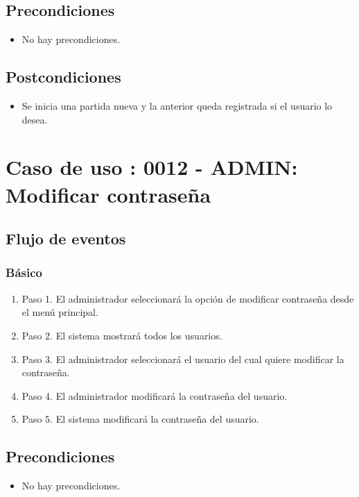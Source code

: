 \subsection{Precondiciones}
\begin{itemize}
\item No hay precondiciones.
\end{itemize}

\subsection{Postcondiciones}
\begin{itemize}
\item Se inicia una partida nueva y la anterior queda registrada si el usuario lo desea. 
\end{itemize}



\section{Caso de uso : 0012 - ADMIN: Modificar contraseña}\label{sec:uc0}
\subsection{Flujo de eventos}
\subsubsection{Básico}

\begin{enumerate}
\item Paso 1.
El administrador seleccionará la opción de modificar contraseña desde el menú principal.
\item Paso 2.
El sistema mostrará todos los usuarios.
\item Paso 3.
El administrador seleccionará el usuario del cual quiere modificar la contraseña.
\item Paso 4.
El administrador modificará la contraseña del usuario.
\item Paso 5.
El sistema modificará la contraseña del usuario.
\end{enumerate}

\subsection{Precondiciones}
\begin{itemize}
\item No hay precondiciones.
\end{itemize}

